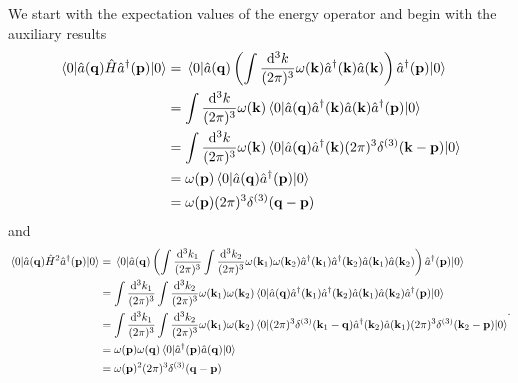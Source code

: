 We start with the expectation values of the energy operator and begin with the auxiliary results
\begin{equation}
	\begin{split}
		\expval{\hat{a}(\vb{q})\hat{H}\hat{a}^\dagger(\vb{p})}{0}
		&=
		\expval{
			\hat{a}(\vb{q})
			\left(
				\int\frac{\dd[3]{k}}{(2\pi)^3}
				\omega(\vb{k})
				\hat{a}^\dagger(\vb{k})
				\hat{a}(\vb{k})
			\right)
			\hat{a}^\dagger(\vb{p})
		}{0}
		\\
		&=
		\int\frac{\dd[3]{k}}{(2\pi)^3}
		\omega(\vb{k})
		\expval{
			\hat{a}(\vb{q})
			\hat{a}^\dagger(\vb{k})
			\hat{a}(\vb{k})
			\hat{a}^\dagger(\vb{p})
		}{0}
		\\
		&=
		\int\frac{\dd[3]{k}}{(2\pi)^3}
		\omega(\vb{k})
		\expval{
			\hat{a}(\vb{q})
			\hat{a}^\dagger(\vb{k})
			(2\pi)^3\delta^{(3)}(\vb{k}-\vb{p})
		}{0}
		\\
		&=
		\omega(\vb{p})
		\expval{
			\hat{a}(\vb{q})
			\hat{a}^\dagger(\vb{p})
		}{0}
		\\
		&=
		\omega(\vb{p})
		(2\pi)^3\delta^{(3)}(\vb{q}-\vb{p})
	\end{split}
\end{equation}
and
\begin{equation}
	\begin{split}
		\expval{
			\hat{a}(\vb{q})
			\hat{H}^2\hat{a}^\dagger(\vb{p})
		}{0}
		&=
		\expval{
			\hat{a}(\vb{q})
			\left(
				\int\frac{\dd[3]{k_1}}{(2\pi)^3}
				\int\frac{\dd[3]{k_2}}{(2\pi)^3}
				\omega(\vb{k}_1)
				\omega(\vb{k}_2)
				\hat{a}^\dagger(\vb{k}_1)
				\hat{a}^\dagger(\vb{k}_2)
				\hat{a}(\vb{k}_1)
				\hat{a}(\vb{k}_2)
			\right)
			\hat{a}^\dagger(\vb{p})
		}{0}
		\\
		&=
		\int\frac{\dd[3]{k_1}}{(2\pi)^3}
		\int\frac{\dd[3]{k_2}}{(2\pi)^3}
		\omega(\vb{k}_1)
		\omega(\vb{k}_2)
		\expval{
			\hat{a}(\vb{q})
			\hat{a}^\dagger(\vb{k}_1)
			\hat{a}^\dagger(\vb{k}_2)
			\hat{a}(\vb{k}_1)
			\hat{a}(\vb{k}_2)
			\hat{a}^\dagger(\vb{p})
		}{0}
		\\
		&=
		\int\frac{\dd[3]{k_1}}{(2\pi)^3}
		\int\frac{\dd[3]{k_2}}{(2\pi)^3}
		\omega(\vb{k}_1)
		\omega(\vb{k}_2)
		\expval{
			(2\pi)^3
			\delta^{(3)}(\vb{k}_1-\vb{q})
			\hat{a}^\dagger(\vb{k}_2)
			\hat{a}(\vb{k}_1)
			(2\pi)^3
			\delta^{(3)}(\vb{k}_2-\vb{p})
		}{0}
		\\
		&=
		\omega(\vb{p})
		\omega(\vb{q})
		\expval{
			\hat{a}^\dagger(\vb{p})
			\hat{a}(\vb{q})
		}{0}
		\\
		&=
		\omega(\vb{p})^2
		(2\pi)^3
		\delta^{(3)}(\vb{q}-\vb{p})
	\end{split}
	.
\end{equation}
